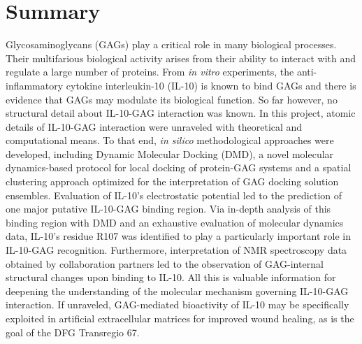 \chapter{Summary}


Glycosaminoglycans (GAGs) play a critical role in many biological processes.
Their multifarious biological activity arises from their ability to interact
with and regulate a large number of proteins. From \textit{in vitro}
experiments, the anti-inflammatory cytokine interleukin-10 (IL-10) is known to
bind GAGs and there is evidence that GAGs may modulate its biological function.
So far however, no structural detail about IL-10-GAG interaction was known. In
this project, atomic details of IL-10-GAG interaction were unraveled with
theoretical and computational means. To that end, \textit{in silico}
methodological approaches were developed, including Dynamic Molecular Docking
(DMD), a novel molecular dynamics-based protocol for local docking of
protein-GAG systems and a spatial clustering approach optimized for the
interpretation of GAG docking solution ensembles. Evaluation of IL-10's
electrostatic potential led to the prediction of one major putative IL-10-GAG
binding region. Via in-depth analysis of this binding region with DMD and an
exhaustive evaluation of molecular dynamics data, IL-10's residue R107 was
identified to play a particularly important role in IL-10-GAG recognition.
Furthermore, interpretation of NMR spectroscopy data obtained by collaboration
partners led to the observation of GAG-internal structural changes upon binding
to IL-10. All this is valuable information for deepening the understanding of
the molecular mechanism governing IL-10-GAG interaction. If unraveled,
GAG-mediated bioactivity of IL-10 may be specifically exploited in artificial
extracellular matrices for improved wound healing, as is the goal of the DFG
Transregio 67.
